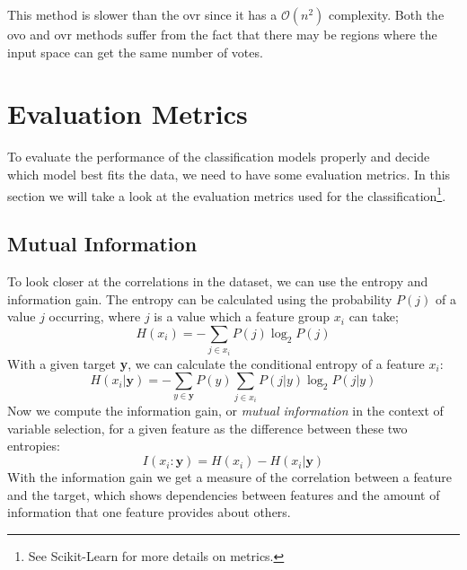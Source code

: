 \documentclass[a4paper, american, 12pt]{report}
\begin{document}
	This method is slower than the \acrshort{ovr} since it has a $\mathcal{O}(n^2)$ complexity. Both the \acrshort{ovo} and \acrshort{ovr} methods suffer from the fact that there may be regions where the input space can get the same number of votes.
	
	
	\section{Evaluation Metrics}
	\label{sect:Theory-EvalMetrics}
	To evaluate the performance of the classification models properly and decide which model best fits the data, we need to have some evaluation metrics. In this section we will take a look at the evaluation metrics used for the classification\footnote{See Scikit-Learn\cite{scikit-learn} for more details on metrics.}. 
	
	
	\subsection{Mutual Information}
	\label{subsect:Theory-MutualInfo}
	To look closer at the correlations in the dataset, we can use the entropy and information gain. The entropy can be calculated using the probability $P(j)$ of a value $j$ occurring, where $j$ is a value which a feature group $x_i$ can take;
	\begin{equation}
	\label{eq:Entropy}
		H(x_i) = -\sum_{j\in x_i}P(j)\log_2 P(j)
	\end{equation}
	With a given target \textbf{y}, we can calculate the conditional entropy of a feature $x_i$:
	\begin{equation}
	\label{eq:CondEntropy}
		H(x_i|\textbf{y})=-\sum_{y\in \textbf{y}}P(y)\sum_{j\in x_i}P(j|y)\log_2 P(j|y)
	\end{equation}
	Now we compute the information gain, or \textit{mutual information} in the context of variable selection, for a given feature as the difference between these two entropies:
	\begin{equation}
	\label{eq:InfoGain}
		I(x_i:\textbf{y})=H(x_i)-H(x_i|\textbf{y})
	\end{equation}
	With the information gain we get a measure of the correlation between a feature and the target, which shows dependencies between features and the amount of information that one feature provides about others.
	
\end{document}
